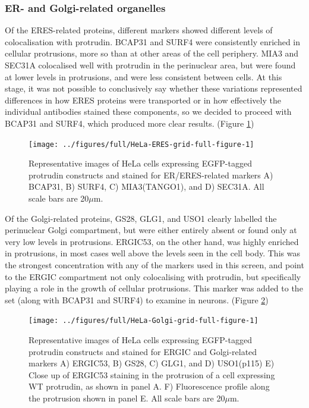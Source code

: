 \documentclass[
  12pt,
  a4paper,
]{book}
\begin{document}
\hypertarget{er--and-golgi-related-organelles}{%
\subsubsection{ER- and Golgi-related organelles}\label{er--and-golgi-related-organelles}}

Of the ERES-related proteins, different markers showed different levels of colocalisation with protrudin. BCAP31 and SURF4 were consistently enriched in cellular protrusions, more so than at other areas of the cell periphery. MIA3 and SEC31A colocalised well with protrudin in the perinuclear area, but were found at lower levels in protrusions, and were less consistent between cells. At this stage, it was not possible to conclusively say whether these variations represented differences in how ERES proteins were transported or in how effectively the individual antibodies stained these components, so we decided to proceed with BCAP31 and SURF4, which produced more clear results. (Figure \ref{fig:HeLa-ERES-grid-full-figure})

\begin{figure}
\texttt{[image: ../figures/full/HeLa-ERES-grid-full-figure-1]} \caption[Protrudin-expressing HeLa cells stained for BCAP31, SURF4, MIA3, and SEC31A]{Representative images of HeLa cells expressing EGFP-tagged protrudin constructs and stained for ER/ERES-related markers A) BCAP31, B) SURF4, C) MIA3(TANGO1), and D) SEC31A.  All scale bars are 20$\mu$m.}\label{fig:HeLa-ERES-grid-full-figure}
\end{figure}

Of the Golgi-related proteins, GS28, GLG1, and USO1 clearly labelled the perinuclear Golgi compartment, but were either entirely absent or found only at very low levels in protrusions. ERGIC53, on the other hand, was highly enriched in protrusions, in most cases well above the levels seen in the cell body. This was the strongest concentration with any of the markers used in this screen, and point to the ERGIC compartment not only colocalising with protrudin, but specifically playing a role in the growth of cellular protrusions. This marker was added to the set (along with BCAP31 and SURF4) to examine in neurons. (Figure \ref{fig:HeLa-Golgi-grid-full-figure})

\begin{figure}
\texttt{[image: ../figures/full/HeLa-Golgi-grid-full-figure-1]} \caption[Protrudin-expressing HeLa cells stained for ERGIC53, GS28, GLG1, and USO1]{Representative images of HeLa cells expressing EGFP-tagged protrudin constructs and stained for ERGIC and Golgi-related markers A) ERGIC53, B) GS28, C) GLG1, and D) USO1(p115)  E) Close up of ERGIC53 staining in the protrusion of a cell expressing WT protrudin, as shown in panel A.  F) Fluorescence profile along the protrusion shown in panel E.  All scale bars are 20$\mu$m.}\label{fig:HeLa-Golgi-grid-full-figure}
\end{figure}
\end{document}
